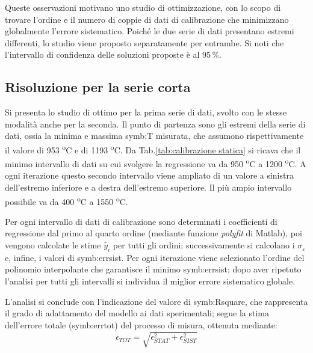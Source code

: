 Queste osservazioni motivano uno studio di ottimizzazione, con lo scopo di trovare l'ordine e il numero di coppie di dati di calibrazione che minimizzano globalmente l'errore sistematico. 
Poiché le due serie di dati presentano estremi differenti, lo studio viene proposto separatamente per entrambe.
Si noti che l'intervallo di confidenza delle soluzioni proposte è al 95\,\%.

\subsection{Risoluzione per la serie corta}
Si presenta lo studio di ottimo per la prima serie di dati, svolto con le stesse modalità anche per la seconda. Il punto di partenza sono gli estremi della serie di dati, ossia la minima e massima \gls{symb:T} misurata, che assumono rispettivamente il valore di 953 \textsuperscript{o}C e di 1193 \textsuperscript{o}C. Da Tab.\ref{tab:calibrazione statica} si ricava che il minimo intervallo di dati su cui svolgere la regressione va da 950 \textsuperscript{o}C a 1200 \textsuperscript{o}C. A ogni iterazione questo secondo intervallo viene ampliato di un valore a sinistra dell'estremo inferiore e a destra dell'estremo superiore. Il più ampio intervallo possibile va da 400 \textsuperscript{o}C a 1550 \textsuperscript{o}C. 

Per ogni intervallo di dati di calibrazione sono determinati i coefficienti di regressione dal primo al quarto ordine (mediante funzione \textit{polyfit} di Matlab), poi vengono calcolate le stime $\tilde{y_i}$ per tutti gli ordini; successivamente si calcolano i $\sigma_{\varepsilon}$ e, infine, i valori di \gls{symb:errsist}. Per ogni iterazione viene selezionato l'ordine del polinomio interpolante che garantisce il minimo \gls{symb:errsist}; dopo aver ripetuto l'analisi per tutti gli intervalli si individua il miglior errore sistematico globale. 

L'analisi si conclude con l'indicazione del valore di \gls{symb:Rsquare}, che rappresenta il grado di adattamento del modello ai dati sperimentali; segue la stima dell'errore totale (\gls{symb:errtot}) del processo di misura, ottenuta mediante: 
\begin{equation}
	\epsilon_{\textit{TOT}}=\sqrt{\epsilon_{\textit{STAT}}^2+\epsilon_{\textit{SIST}}^2}
\end{equation}

